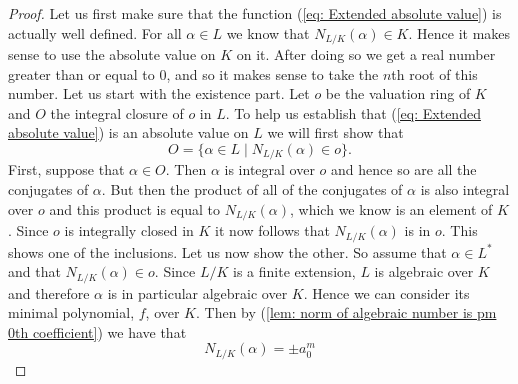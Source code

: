 \documentclass{article}
\begin{document}
\begin{proof}
    Let us first make sure that the function (\ref{eq: Extended absolute value}) is actually well defined. For all $\alpha \in L$ we know that $N_{L/K}(\alpha) \in K$. Hence it makes sense to use the absolute value on $K$ on it. After doing so we get a real number greater than or equal to 0, and so it makes sense to take the $n$th root of this number. Let us start with the existence part. Let $o$ be the valuation ring of $K$ and $O$ the integral closure of $o$ in $L$. To help us establish that (\ref{eq: Extended absolute value}) is an absolute value on $L$ we will first show that
    \begin{equation}\label{eq: Extension of absolute value helper result}
        O = \{\alpha \in L \mid N_{L/K}(\alpha) \in o \}.\tag{$\triangle$}
    \end{equation}
    First, suppose that $\alpha \in O$. Then $\alpha$ is integral over $o$ and hence so are all the conjugates of $\alpha$. But then the product of all of the conjugates of $\alpha$ is also integral over $o$ and this product is equal to $N_{L/K}(\alpha)$, which we know is an element of $K$. Since $o$ is integrally closed in $K$ it now follows that $N_{L/K}(\alpha)$ is in $o$. This shows one of the inclusions. Let us now show the other. So assume that $\alpha \in L^*$ and that $N_{L/K}(\alpha) \in o$. Since $L / K$ is a finite extension, $L$ is algebraic over $K$ and therefore $\alpha$ is in particular algebraic over $K$. Hence we can consider its minimal polynomial, $f$, over $K$. Then by (\ref{lem: norm of algebraic number is pm 0th coefficient}) we have that
    $$N_{L / K}(\alpha) =  \pm a_0^m$$

\end{proof}
\end{document}
